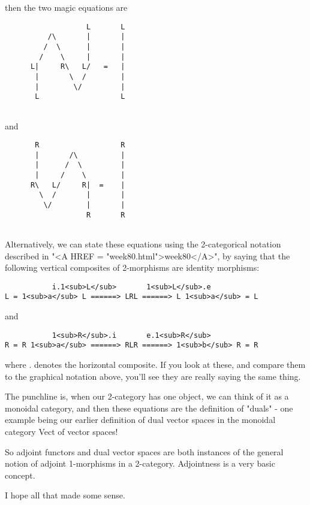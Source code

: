 then the two magic equations are

                  
\begin{verbatim}
                   L       L
          /\       |       |
         /  \      |       |
        /    \     |       |
      L|     R\   L/   =   | 
       |       \  /        |
       |        \/         |
       L                   L


\end{verbatim}
    
and

\begin{verbatim}
       R                   R
       |       /\          |
       |      /  \         |
       |     /    \        |
      R\   L/     R|  =    | 
        \  /       |       |
         \/        |       |
                   R       R


\end{verbatim}
    
Alternatively, we can state these equations using the 2-categorical
notation described in "<A HREF = "week80.html">week80</A>", by saying that the following vertical
composites of 2-morphisms are identity morphisms:

\begin{verbatim}
           i.1<sub>L</sub>       1<sub>L</sub>.e
L = 1<sub>a</sub> L ======> LRL ======> L 1<sub>a</sub> = L

\end{verbatim}
    
and
\begin{verbatim}
           1<sub>R</sub>.i       e.1<sub>R</sub>
R = R 1<sub>a</sub> ======> RLR ======> 1<sub>b</sub> R = R

\end{verbatim}
    
where . denotes the horizontal composite.  If you look at these, and
compare them to the graphical notation above, you'll see they are really
saying the same thing.

The punchline is, when our 2-category has one object, we can think of it
as a monoidal category, and then these equations are the definition of
"duals" - one example being our earlier definition of dual vector
spaces in the monoidal category Vect of vector spaces!

So adjoint functors and dual vector spaces are both instances of 
the general notion of adjoint 1-morphisms in a 2-category.  Adjointness
is a very basic concept.

I hope all that made some sense.  

